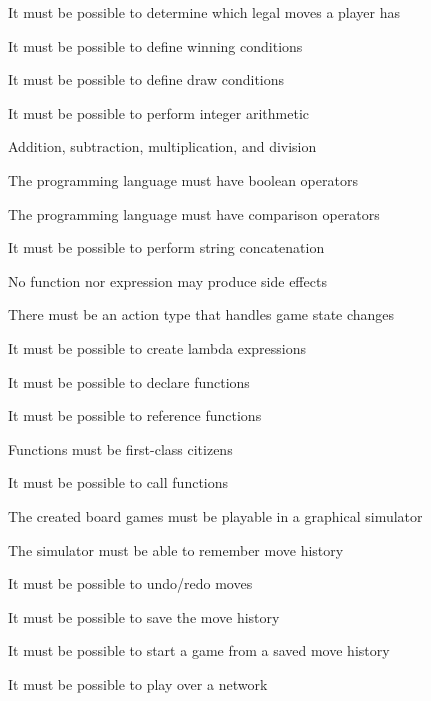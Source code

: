 \begin{enumerate}[noitemsep]
  \item It must be possible to determine which legal moves a player has
  \item It must be possible to define winning conditions
  \item It must be possible to define draw conditions
  \item It must be possible to perform integer arithmetic
  \begin{nlist}
    \item Addition, subtraction, multiplication, and division
    \item The programming language must have boolean operators
    \item The programming language must have comparison operators
  \end{nlist}
  \item It must be possible to perform string concatenation
  \item No function nor expression may produce side effects
  \item There must be an action type that handles game state changes
  \item It must be possible to create lambda expressions
  \item It must be possible to declare functions
  \item It must be possible to reference functions
  \begin{nlist}
    \item Functions must be first-class citizens
    \item It must be possible to call functions
  \end{nlist}
  \item The created board games must be playable in a graphical simulator
  \item The simulator must be able to remember move history
  \begin{nlist}
    \item It must be possible to undo/redo moves
    \item It must be possible to save the move history
    \begin{nlist}
      \item It must be possible to start a game from a saved move history
    \end{nlist}
  \item It must be possible to play over a network
  \end{nlist}
\end{enumerate}

